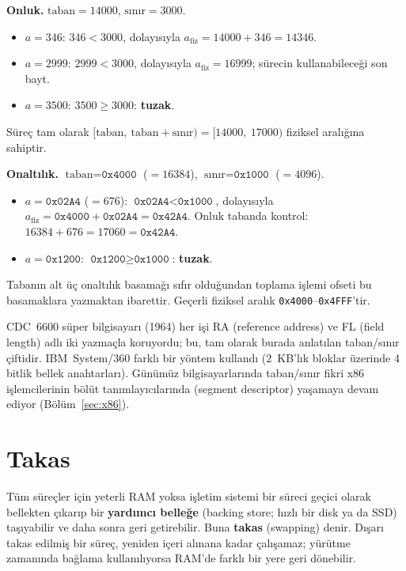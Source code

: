 \documentclass[11pt,a4paper]{article}
\newcommand{\term}[1]{\textbf{\color{mintdeep}#1}}
\begin{document}
\begin{example}
\textbf{Onluk.} $\text{taban} = 14000$, $\text{sınır} = 3000$.
\begin{itemize}
  \item $a = 346$: $346 < 3000$, dolayısıyla $a_{\text{fiz}} = 14000 + 346 = 14346$.
  \item $a = 2999$: $2999 < 3000$, dolayısıyla $a_{\text{fiz}} = 16999$; sürecin kullanabileceği son bayt.
  \item $a = 3500$: $3500 \ge 3000$: \textbf{tuzak}.
\end{itemize}
Süreç tam olarak $[\text{taban},\ \text{taban}+\text{sınır}) = [14000,\ 17000)$ fiziksel aralığına sahiptir.

\textbf{Onaltılık.} $\text{taban} = \texttt{0x4000}$ ($=16384$), $\text{sınır} = \texttt{0x1000}$ ($=4096$).
\begin{itemize}
  \item $a = \texttt{0x02A4}$ ($=676$): $\texttt{0x02A4} < \texttt{0x1000}$, dolayısıyla $a_{\text{fiz}} = \texttt{0x4000} + \texttt{0x02A4} = \texttt{0x42A4}$. Onluk tabanda kontrol: $16384 + 676 = 17060 = \texttt{0x42A4}$.
  \item $a = \texttt{0x1200}$: $\texttt{0x1200} \ge \texttt{0x1000}$: \textbf{tuzak}.
\end{itemize}
Tabanın alt üç onaltılık basamağı sıfır olduğundan toplama işlemi ofseti bu basamaklara yazmaktan ibarettir. Geçerli fiziksel aralık \texttt{0x4000}--\texttt{0x4FFF}'tir.
\end{example}

\begin{histnote}
CDC~6600 süper bilgisayarı (1964) her işi RA (reference address) ve FL (field length) adlı iki yazmaçla koruyordu; bu, tam olarak burada anlatılan taban/sınır çiftidir. IBM~System/360 farklı bir yöntem kullandı (2~KB'lık bloklar üzerinde 4 bitlik bellek anahtarları). Günümüz bilgisayarlarında taban/sınır fikri x86 işlemcilerinin bölüt tanımlayıcılarında (segment descriptor) yaşamaya devam ediyor (Bölüm~\ref{sec:x86}).
\end{histnote}

\section{Takas}

Tüm süreçler için yeterli RAM yoksa işletim sistemi bir süreci geçici olarak bellekten çıkarıp bir \term{yardımcı belleğe} (backing store; hızlı bir disk ya da SSD) taşıyabilir ve daha sonra geri getirebilir. Buna \term{takas} (swapping) denir. Dışarı takas edilmiş bir süreç, yeniden içeri alınana kadar çalışamaz; yürütme zamanında bağlama kullanılıyorsa RAM'de farklı bir yere geri dönebilir.
\end{document}
